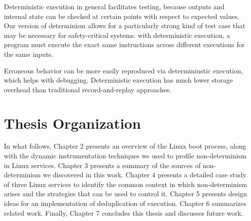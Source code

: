 Deterministic execution in general facilitates testing,
because outputs and internal state can be checked at 
certain points with respect to expected values. Our version
of determinism allows for a particularly strong kind
of test case that may be necessary for safety-critical 
systems: with deterministic execution, a program 
must execute the exact same instructions 
across different executions for the same inputs. \newline 

Erroneous behavior can be more easily reproduced
via determininstic execution, which
helps with debugging. Deterministic
execution has much lower storage overhead
than traditional record-and-replay approaches. 

\section{Thesis Organization} 
In what follows, Chapter 2 presents an overview of
the Linux boot process, along with the dynamic instrumentation
techniques we used to profile non-determinism in Linux services.
Chapter 3 presents a summary of the sources of non-determinism
we discovered in this work.
Chapter 4 presents a detailed case study of three Linux services
to identify the common context in which non-determinism arises
and the strategies that can be used to control it.
Chapter 5 presents design ideas for an implementation of deduplication of execution.
Chapter 6 summarizes related work. Finally, Chapter 7 concludes this thesis
and discusses future work.

